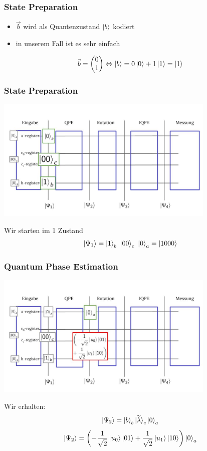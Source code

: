 \begin{frame}
    \frametitle{State Preparation}

    \begin{itemize}
        \item $\vec{b}$ wird als Quantenzustand $\ket{b}$ kodiert
        \item in unserem Fall ist es sehr einfach
    \end{itemize}

    $$\vec{b} = \begin{pmatrix} 0\\ 1\\ \end{pmatrix} \Leftrightarrow \ket{b} = 0 \ket{0} + 1 \ket{1} = \ket{1}$$
\end{frame}


\begin{frame}
    \frametitle{State Preparation}

    \begin{center}
    \includegraphics[width=10.5cm]{img/example_circuit/example_circuit_1.jpg}
    \end{center}

    Wir starten im 1 Zustand
    $$\ket{\Psi_1} = \ket{1}_b\ \ket{00}_c\ \ket{0}_a = \ket{1000}$$

\end{frame}


\begin{frame}
    \frametitle{Quantum Phase Estimation}
    \begin{center}
    \includegraphics[width=10.5cm]{img/example_circuit/example_circuit_2.jpg}
    \end{center}

    Wir erhalten:
    $$\ket{\Psi_2} = \ket{b}_b \ket{\widetilde{\lambda}}_c\ket{0}_a$$
    $$\ket{\Psi_2} =\left(-\frac{1}{\sqrt{2}} \ket{u_0} \ket{01} +\frac{1}{\sqrt{2}}  
    \ket{u_1} \ket{10} \right)  \ket{0}_a$$

\end{frame}

